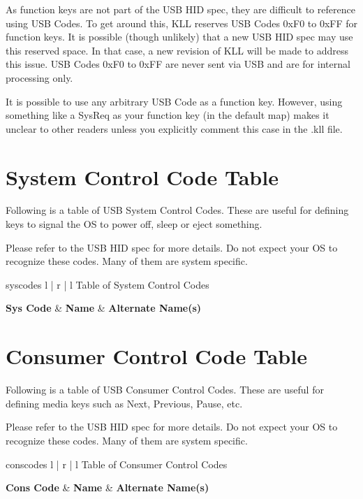 \documentclass{kiibohd-template}
\begin{document}
As function keys are not part of the USB HID spec, they are difficult to reference using USB Codes.
To get around this, KLL reserves USB Codes 0xF0 to 0xFF for function keys.
It is possible (though unlikely) that a new USB HID spec may use this reserved space.
In that case, a new revision of KLL will be made to address this issue.
USB Codes 0xF0 to 0xFF are never sent via USB and are for internal processing only.

It is possible to use any arbitrary USB Code as a function key.
However, using something like a SysReq as your function key (in the default map) makes it unclear to other readers unless you explicitly comment this case in the .kll file.


\chapter{System Control Code Table}
\label{chpt:SysCodeTable}

Following is a table of USB System Control Codes.
These are useful for defining keys to signal the OS to power off, sleep or eject something.

Please refer to the USB HID spec for more details.
Do not expect your OS to recognize these codes.
Many of them are system specific.

\begin{ltable}{syscodes}{ l | r | l }{Table of System Control Codes}

\textbf{Sys Code} & \textbf{Name} & \textbf{Alternate Name(s)} \\
\hline
\hline


\end{ltable}


\chapter{Consumer Control Code Table}
\label{chpt:ConsCodeTable}

Following is a table of USB Consumer Control Codes.
These are useful for defining media keys such as Next, Previous, Pause, etc.

Please refer to the USB HID spec for more details.
Do not expect your OS to recognize these codes.
Many of them are system specific.

\begin{ltable}{conscodes}{ l | r | l }{Table of Consumer Control Codes}

\textbf{Cons Code} & \textbf{Name} & \textbf{Alternate Name(s)} \\
\hline
\hline


\end{ltable}
\end{document}
